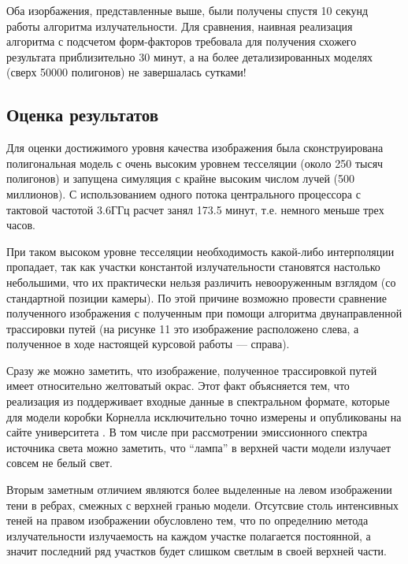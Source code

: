 \documentclass[12pt]{article}
\begin{document}
Оба изорбажения, представленные выше, были получены спустя 10 секунд работы алгоритма излучательности. Для сравнения, наивная реализация алгоритма с подсчетом форм-факторов требовала для получения схожего результата приблизительно 30 минут, а на более детализированных моделях (сверх 50000 полигонов) не завершалась сутками!

\subsection{Оценка результатов}
Для оценки достижимого уровня качества изображения была сконструирована полигональная модель с очень высоким уровнем тесселяции (около 250 тысяч полигонов) и запущена симуляция с крайне высоким числом лучей (500 миллионов). С использованием одного потока центрального процессора с тактовой частотой 3.6ГГц расчет занял 173.5 минут, т.е. немного меньше трех часов.

При таком высоком уровне тесселяции необходимость какой-либо интерполяции пропадает, так как участки константой излучательности становятся настолько небольшими, что их практически нельзя различить невооруженным взглядом (со стандартной позиции камеры). По этой причине возможно провести сравнение полученного изображения с полученным при помощи алгоритма двунаправленной трассировки путей \cite{karlIMG} (на рисунке 11 это изображение расположено слева, а полученное в ходе настоящей курсовой работы --- справа).

Сразу же можно заметить, что изображение, полученное трассировкой путей имеет относительно желтоватый окрас. Этот факт объясняется тем, что реализация из \cite{karlIMG} поддерживает входные данные в спектральном формате, которые для модели коробки Корнелла исключительно точно измерены и опубликованы на сайте университета \cite{Cor05}. В том числе при рассмотрении эмиссионного спектра источника света можно заметить, что ``лампа'' в верхней части модели излучает совсем не белый свет.

Вторым заметным отличием являются более выделенные на левом изображении тени в ребрах, смежных с верхней гранью модели. Отсутсвие столь интенсивных теней на правом изображении обусловлено тем, что по определнию метода излучательности излучаемость на каждом участке полагается постоянной, а значит последний ряд участков будет слишком светлым в своей верхней части.
\end{document}

